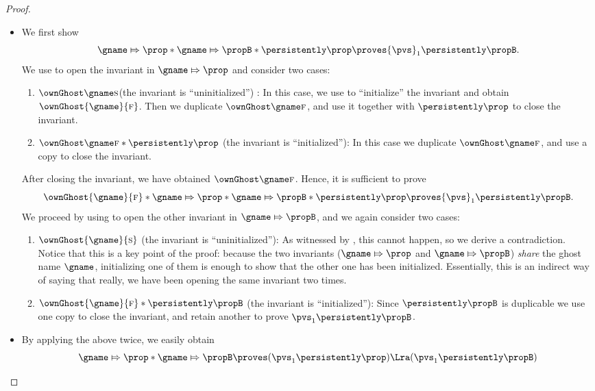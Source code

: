 \begin{proof}~%

\begin{itemize}
  \item We first show
    \[\gname \Mapsto \prop * \gname \Mapsto \propB * \persistently \prop \proves {\pvs}_1 \persistently \propB.\]
    We use  to open the invariant in $\gname \Mapsto \prop$ and consider two cases:
    \begin{enumerate}
    \item $\ownGhost \gname \starttoken$(the invariant is ``uninitialized'') : In this case, we use  to ``initialize'' the invariant and obtain $\ownGhost{\gname}{\finishtoken}$.
      Then we duplicate $\ownGhost \gname \finishtoken$, and use it together with $\persistently \prop$ to close the invariant.
    \item $\ownGhost \gname \finishtoken * \persistently \prop$ (the invariant is ``initialized''): In this case we duplicate $\ownGhost \gname \finishtoken$, and use a copy to close the invariant.
    \end{enumerate}
    After closing the invariant, we have obtained $\ownGhost \gname \finishtoken$.
    Hence, it is sufficient to prove
    \[
      \ownGhost{\gname}{\finishtoken} * \gname \Mapsto \prop * \gname \Mapsto \propB * \persistently \prop \proves {\pvs}_1 \persistently \propB.\]
    We proceed by using  to open the other invariant in $\gname \Mapsto \propB$, and we again consider two cases:
    \begin{enumerate}
    \item $\ownGhost{\gname}{\starttoken}$ (the invariant is ``uninitialized''): As witnessed by , this cannot happen, so we derive a contradiction.
      Notice that this is a key point of the proof: because the two invariants ($\gname \Mapsto \prop$ and $\gname \Mapsto \propB$) \emph{share} the ghost name $\gname$, initializing one of them is enough to show that the other one has been initialized.
      Essentially, this is an indirect way of saying that really, we have been opening the same invariant two times.
    \item $\ownGhost{\gname}{\finishtoken} * \persistently \propB$ (the invariant is ``initialized''):
      Since $\persistently \propB$ is duplicable we use one copy to close the invariant, and retain another to prove ${\pvs}_1 \persistently \propB$.
    \end{enumerate}
\item By applying the above twice, we easily obtain
\[ \gname \Mapsto \prop * \gname \Mapsto \propB \proves ({\pvs}_1 \persistently \prop) \Lra ({\pvs}_1 \persistently \propB) \]
\end{itemize}
\end{proof}
